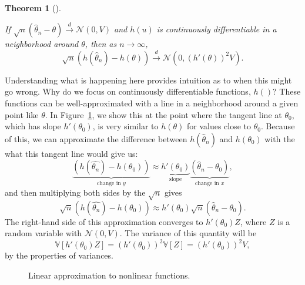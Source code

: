 \documentclass[
  13pt,
  letterpaper,
  DIV=11,
  numbers=noendperiod]{scrreprt}
\newcommand{\V}{\mathbb{V}}
\newcommand{\N}{\mathcal{N}}
\newcommand{\indist}{\overset{d}{\to}}
\theoremstyle{plain}
\newtheorem{theorem}{Theorem}[chapter]
\theoremstyle{definition}
\theoremstyle{definition}
\theoremstyle{remark}
\begin{document}
\begin{theorem}[]\protect\hypertarget{thm-delta-method}{}\label{thm-delta-method}

If \(\sqrt{n}\left(\widehat{\theta}_n - \theta\right) \indist \N(0, V)\)
and \(h(u)\) is continuously differentiable in a neighborhood around
\(\theta\), then as \(n\to\infty\), \[
\sqrt{n}\left(h(\widehat{\theta}_n) - h(\theta) \right) \indist \N(0, (h'(\theta))^2 V).
\]

\end{theorem}

Understanding what is happening here provides intuition as to when this
might go wrong. Why do we focus on continuously differentiable
functions, \(h()\)? These functions can be well-approximated with a line
in a neighborhood around a given point like \(\theta\). In
Figure~\ref{fig-delta}, we show this at the point where the tangent line
at \(\theta_0\), which has slope \(h'(\theta_0)\), is very similar to
\(h(\theta)\) for values close to \(\theta_0\). Because of this, we can
approximate the difference between \(h(\widehat{\theta}_n)\) and
\(h(\theta_0)\) with the what this tangent line would give us: \[
\underbrace{\left(h(\widehat{\theta_n}) - h(\theta_0)\right)}_{\text{change in } y} \approx \underbrace{h'(\theta_0)}_{\text{slope}} \underbrace{\left(\widehat{\theta}_n - \theta_0\right)}_{\text{change in } x},
\] and then multiplying both sides by the \(\sqrt{n}\) gives \[
\sqrt{n}\left(h(\widehat{\theta_n}) - h(\theta_0)\right) \approx h'(\theta_0)\sqrt{n}\left(\widehat{\theta}_n - \theta_0\right). 
\] The right-hand side of this approximation converges to
\(h'(\theta_0)Z\), where \(Z\) is a random variable with \(\N(0, V)\).
The variance of this quantity will be \[
\V[h'(\theta_0)Z] = (h'(\theta_0))^2\V[Z] = (h'(\theta_0))^2V,
\] by the properties of variances.

\begin{figure}[th]


\caption{\label{fig-delta}Linear approximation to nonlinear functions.}

\end{figure}%
\end{document}
